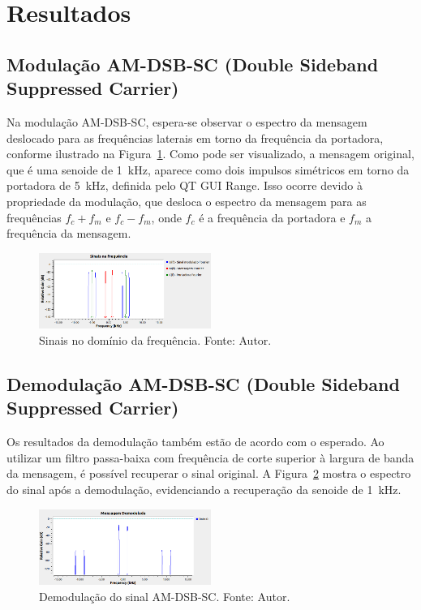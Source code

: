 \section{Resultados}

\subsection{Modulação AM-DSB-SC (Double Sideband Suppressed Carrier)}

Na modulação AM-DSB-SC, espera-se observar o espectro da mensagem deslocado para as frequências laterais em torno da frequência da portadora, conforme ilustrado na Figura~\ref{fig:sinais_freq_am_dsb}. Como pode ser visualizado, a mensagem original, que é uma senoide de 1~kHz, aparece como dois impulsos simétricos em torno da portadora de 5~kHz, definida pelo QT GUI Range. Isso ocorre devido à propriedade da modulação, que desloca o espectro da mensagem para as frequências $f_c + f_m$ e $f_c - f_m$, onde $f_c$ é a frequência da portadora e $f_m$ a frequência da mensagem.

\begin{figure}[h]
    \centering
    \includegraphics[width=0.5\textwidth]{images/sinais_freqe_gnu.png}
    \caption{Sinais no domínio da frequência. Fonte: Autor.}
    \label{fig:sinais_freq_am_dsb}
\end{figure}

\subsection{Demodulação AM-DSB-SC (Double Sideband Suppressed Carrier)}

Os resultados da demodulação também estão de acordo com o esperado. Ao utilizar um filtro passa-baixa com frequência de corte superior à largura de banda da mensagem, é possível recuperar o sinal original. A Figura~\ref{fig:demodulacao_am_dsb} mostra o espectro do sinal após a demodulação, evidenciando a recuperação da senoide de 1~kHz.

\begin{figure}[h]
    \centering
    \includegraphics[width=0.5\textwidth]{images/demodulacao_am_dsb_freq.png}
    \caption{Demodulação do sinal AM-DSB-SC. Fonte: Autor.}
    \label{fig:demodulacao_am_dsb}
\end{figure}

